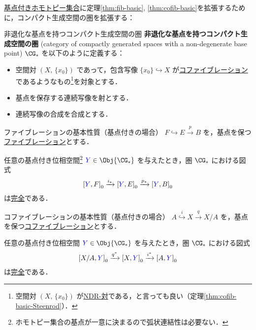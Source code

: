 \documentclass[algtopo_main]{subfiles}
\begin{document}
\hyperref[def:homotopy-set]{基点付きホモトピー集合}に定理\ref{thm:fib-basic}, \ref{thm:cofib-basic}を拡張するために，コンパクト生成空間の圏を拡張する：
\begin{mydef}[label=def:CG-nd]{非退化な基点を持つコンパクト生成空間の圏}
    \textbf{非退化な基点を持つコンパクト生成空間の圏} (category of compactly generated spaces with a non-degenerate base point) $\CG_*$
    を以下のように定義する：
    \begin{itemize}
        \item 空間対 $(X,\, \{x_0\})$ であって，包含写像 $\{x_0\} \hookrightarrow X$ が\hyperref[def:cofibration]{コファイブレーション}であるようなもの\footnote{空間対 $(X,\, \{x_0\})$ が\hyperref[def:NDR]{NDR-対}である，と言っても良い（定理\ref{thm:cofib-basic-Steenrod}）．}を対象とする．
        \item 基点を保存する連続写像を射とする．
        \item 連続写像の合成を合成とする．
    \end{itemize}
\end{mydef}

\begin{mytheo}[label=thm:fib-basic-b]{ファイブレーションの基本性質（基点付きの場合）}
    $F \hookrightarrow E \xrightarrow{p} B$ を，基点を保つ\hyperref[def:fibration]{ファイブレーション}とする．
    
    任意の基点付き位相空間\footnote{ホモトピー集合の基点が一意に決まるので弧状連結性は必要ない．} $\textcolor{blue}{Y} \in \Obj{\CG_*}$ を与えたとき，圏 $\CG_*$ における図式
    \begin{align}
        \comm{\textcolor{blue}{Y}}{F}_0 \xrightarrow{i_*} \comm{\textcolor{blue}{Y}}{E}_0 \xrightarrow{p_*} \comm{\textcolor{blue}{Y}}{B}_0
    \end{align}
    は\hyperref[def:ES-SETS]{完全}である．
\end{mytheo}

\begin{mytheo}[label=thm:cofib-basic-b]{コファイブレーションの基本性質（基点付きの場合）}
    $A \stackrel{i}{\hookrightarrow} X \xrightarrow{q} X/A$ を，基点を保つ\hyperref[def:cofibration]{コファイブレーション}とする．

    任意の基点付き位相空間 $\textcolor{blue}{Y} \in \Obj{\CG_*}$ を与えたとき，圏 $\CG_*$ における図式
    \begin{align}
        \comm{X/A}{\textcolor{blue}{Y}}_0 \xrightarrow{q^*} \comm{X}{\textcolor{blue}{Y}}_0 \xrightarrow{i^*} \comm{A}{\textcolor{blue}{Y}}_0
    \end{align}
    は\hyperref[def:ES-SETS]{完全}である．
\end{mytheo}
\end{document}
